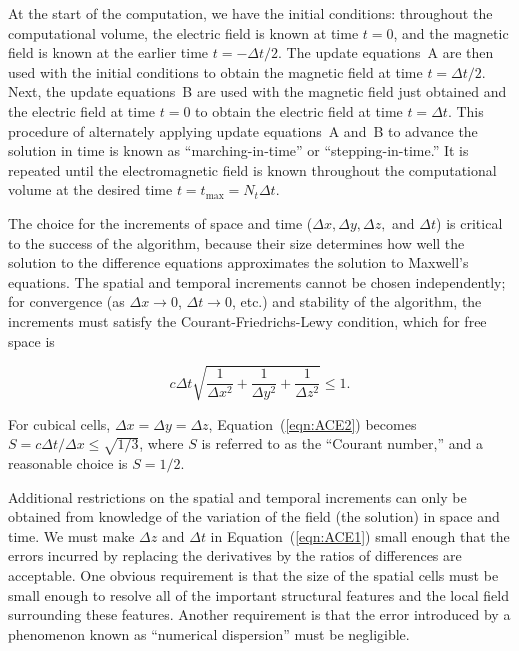 At the start of the computation, we have the initial conditions: throughout the computational volume, the electric field is known at time $t=0$, and the magnetic field is known at the earlier time $t = -\Delta t/2$.  The update equations~A are then used with the initial conditions to obtain the magnetic field at time $t=\Delta t/2$.  Next, the update equations~B are used with the magnetic field just obtained and the electric field at time $t=0$ to obtain the electric field at time $t=\Delta t$.  This procedure of alternately applying update equations~A and~B to advance the solution in time is known as ``marching-in-time'' or ``stepping-in-time.''  It is repeated until the electromagnetic field is known throughout the computational volume at the desired time $t=t_\text{max} = N_t \Delta t$.

The choice for the increments of space and time ($\Delta x, \Delta y, \Delta z,$ and $\Delta t$) is critical to the success of the algorithm, because their size determines how well the solution to the difference equations approximates the solution to Maxwell's equations.  The spatial and temporal increments cannot be chosen independently; for convergence (as $\Delta x \rightarrow 0$, $\Delta t \rightarrow 0$, etc.) and stability of the algorithm, the increments must satisfy the Courant-Friedrichs-Lewy condition, which for free space is

\begin{equation}
c \Delta t \sqrt{ \frac{1}{\Delta x^2} +  \frac{1}{\Delta y^2} + \frac{1}{\Delta z^2} } \leq 1.
\label{eqn:ACE2}
\end{equation}

\noindent For cubical cells, $\Delta x = \Delta y = \Delta z$, Equation~(\ref{eqn:ACE2}) becomes $S=c \Delta t / \Delta x \leq \sqrt{1/3}$, where $S$ is referred to as the ``Courant number,'' and a reasonable choice is $S=1/2$.

Additional restrictions on the spatial and temporal increments can only be obtained from knowledge of the variation of the field (the solution) in space and time.  We must make $\Delta z$ and $\Delta t$ in Equation~(\ref{eqn:ACE1}) small enough that the errors incurred by replacing the derivatives by the ratios of differences are acceptable.  One obvious requirement is that the size of the spatial cells must be small enough to resolve all of the important structural features and the local field surrounding these features.  Another requirement is that the error introduced by a phenomenon known as ``numerical dispersion'' must be negligible.

